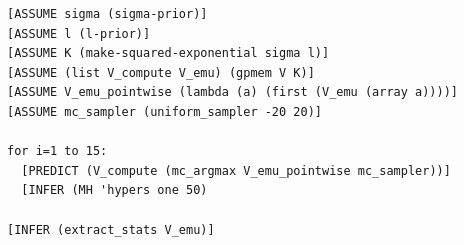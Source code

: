 \documentclass{article} %
\newcommand{\gpmem}{\texttt{gpmem}}
\begin{document}
\begin{lstlisting}[float,frame=single,caption={
  Code for Bayesian optimization using \gpmem.
  %The procedure \texttt{V\_compute} probes \texttt{V} directly, thus improving the GP model \texttt{V\_emu}.
  %(\texttt{V\_emu\_pointwise} is simply a shortcut for sampling the GP model at a single point; \texttt{V\_emu} is more general, allowing joint samples to be taken at any set of points.)
  In the loop, \texttt{V\_compute} is called to probe the value of \texttt{V} at a new argument.
  The new argument, \texttt{(mc\_argmax V\_emu\_pointwise mc\_sampler)}, is a Monte Carlo estimate of the maximum pointwise sample of \texttt{V\_emu} (itself a stochastic quantity), with the Monte Carlo samples being drawn in this case uniformly between $-20$ and $20$.
  After each new call to \texttt{V\_compute}, the Metropolis--Hastings algorithm is used to perform inference on the hyperparameters of the covariance function in the GP model in light of the new conditioning data.
  Once enough calls to \texttt{V\_compute} have been made (in our case we stopped at 15 calls), we can inspect the full list of probed $(a,r)$ pairs with \texttt{extract\_stats}.
  The answer to our maximization problem is simply the pair having the highest $r$; but our algorithm also learns more potentially useful information.
},mathescape,label=alg:bayesopt]
[ASSUME sigma (sigma-prior)]
[ASSUME l (l-prior)]
[ASSUME K (make-squared-exponential sigma l)]
[ASSUME (list V_compute V_emu) (gpmem V K)]
[ASSUME V_emu_pointwise (lambda (a) (first (V_emu (array a))))]
[ASSUME mc_sampler (uniform_sampler -20 20)]

for i=1 to 15:
  [PREDICT (V_compute (mc_argmax V_emu_pointwise mc_sampler))]
  [INFER (MH 'hypers one 50)

[INFER (extract_stats V_emu)]
\end{lstlisting}
\end{document}
